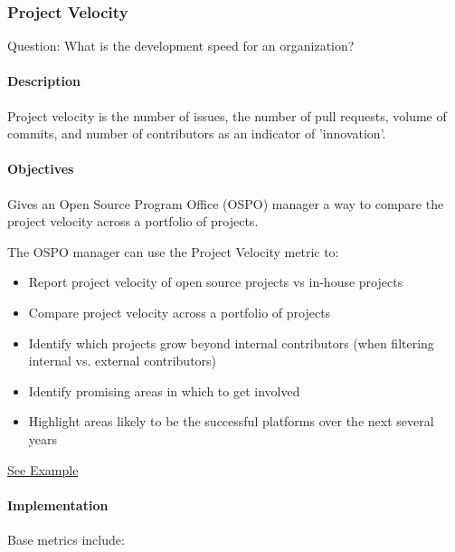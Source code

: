 \hypertarget{project-velocity}{%
\subsubsection{Project Velocity}\label{project-velocity}}

Question: What is the development speed for an organization?

\hypertarget{description}{%
\paragraph{Description}\label{description}}

Project velocity is the number of issues, the number of pull requests,
volume of commits, and number of contributors as an indicator of
'innovation'.

\hypertarget{objectives}{%
\paragraph{Objectives}\label{objectives}}

Gives an Open Source Program Office (OSPO) manager a way to compare the
project velocity across a portfolio of projects.

The OSPO manager can use the Project Velocity metric to:

\begin{itemize}
\tightlist
\item
  Report project velocity of open source projects vs in-house projects
\item
  Compare project velocity across a portfolio of projects
\item
  Identify which projects grow beyond internal contributors (when
  filtering internal vs. external contributors)
\item
  Identify promising areas in which to get involved
\item
  Highlight areas likely to be the successful platforms over the next
  several years
\end{itemize}

\href{https://www.cncf.io/blog/2017/06/05/30-highest-velocity-open-source-projects}{See
Example}

\hypertarget{implementation}{%
\paragraph{Implementation}\label{implementation}}

Base metrics include:

